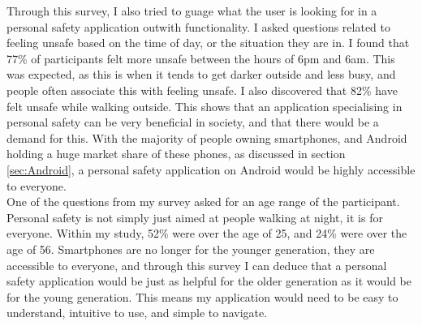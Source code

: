 \documentclass[a4paper]{report}
\begin{document}
Through this survey, I also tried to guage what the user is looking for in a personal safety application outwith functionality. I asked questions related to feeling unsafe based on the time of day, or the situation they are in. I found that 77\% of participants felt more unsafe between the hours of 6pm and 6am. This was expected, as this is when it tends to get darker outside and less busy, and people often associate this with feeling unsafe. I also discovered that 82\% have felt unsafe while walking outside. This shows that an application specialising in personal safety can be very beneficial in society, and that there would be a demand for this. With the majority of people owning smartphones, and Android holding a huge market share of these phones, as discussed in section \ref{sec:Android}, a personal safety application on Android would be highly accessible to everyone. \\One of the questions from my survey asked for an age range of the participant. Personal safety is not simply just aimed at people walking at night, it is for everyone. Within my study, 52\% were over the age of 25, and 24\% were over the age of 56. Smartphones are no longer for the younger generation, they are accessible to everyone, and through this survey I can deduce that a personal safety application would be just as helpful for the older generation as it would be for the young generation. This means my application would need to be easy to understand, intuitive to use, and simple to navigate.
\newpage
\end{document}
